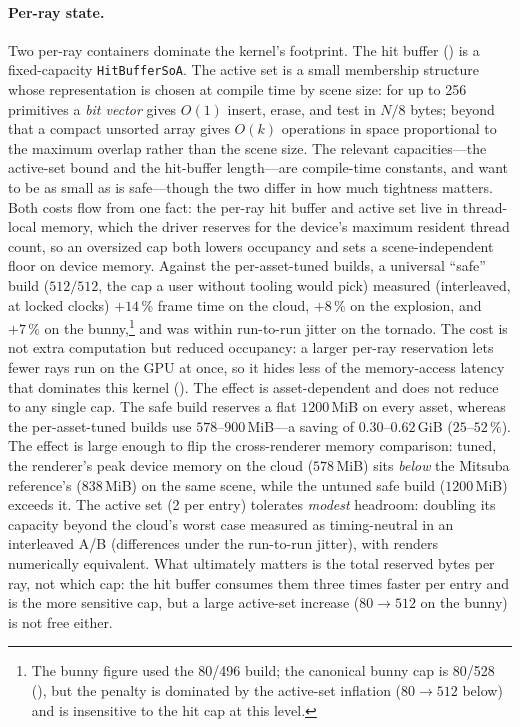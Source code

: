 \paragraph{Per-ray state.} Two per-ray containers dominate the kernel's footprint. The hit buffer
() is a fixed-capacity \texttt{HitBufferSoA}. The active set is a small membership
structure whose representation is chosen at compile time by scene size: for up to \num{256} primitives a
\emph{bit vector} gives $O(1)$ insert, erase, and test in $N/8$ bytes; beyond that a compact unsorted
array gives $O(k)$ operations in space proportional to the maximum overlap rather
than the scene size. The relevant capacities---the active-set bound and the hit-buffer length---are
compile-time constants, and want to be as small as is safe---though the two differ in how much
tightness matters. Both costs flow from one fact: the per-ray hit buffer and active set live in thread-local memory,
which the driver reserves for the device's maximum resident thread count, so an oversized cap both
lowers occupancy and sets a scene-independent floor on device memory. Against the per-asset-tuned
builds, a universal ``safe'' build ($512/512$, the cap a user without tooling would pick) measured
(interleaved, at locked clocks) $+14\,\%$ frame time on the cloud, $+8\,\%$ on the explosion, and
$+7\,\%$ on the bunny,\footnote{The bunny figure used the \num{80}/\num{496} build; the canonical
bunny cap is \num{80}/\num{528} (), but the penalty is dominated by the active-set
inflation ($80\to512$ below) and is insensitive to the hit cap at this level.} and was within
run-to-run jitter on the tornado. The cost is not extra
computation but reduced occupancy: a larger per-ray reservation lets fewer rays run on the GPU at once,
so it hides less of the memory-access latency that dominates this kernel (). The
effect is asset-dependent and does not reduce to any single cap. The safe build reserves a flat $1200\,$MiB on every asset,
whereas the per-asset-tuned builds use $578$--$900\,$MiB---a saving of $0.30$--$0.62\,$GiB
($25$--$52\,\%$). The effect is large enough to flip the cross-renderer memory comparison: tuned, the
renderer's peak device memory on the cloud ($578\,$MiB) sits \emph{below} the Mitsuba reference's
($838\,$MiB) on the same scene, while the untuned safe build ($1200\,$MiB) exceeds it. The active set
(\SI{2}{\byte} per entry) tolerates \emph{modest} headroom: doubling its
capacity beyond the cloud's worst case measured as timing-neutral in an interleaved A/B (differences
under the run-to-run jitter), with renders numerically equivalent. What ultimately matters is the total
reserved bytes per ray, not which cap: the hit buffer consumes them three times faster per entry and is
the more sensitive cap, but a large active-set increase ($80\to512$ on the bunny) is not free either.

